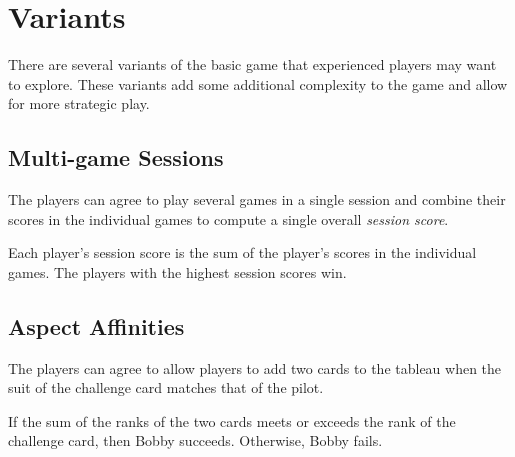 \documentclass[a4paper, 10pt,notumble]{leaflet}
\begin{document}
\section{Variants}
There are several variants of the basic game that experienced players may want to explore. These variants add some additional complexity to the game and allow for more strategic play.

\subsection{Multi-game Sessions}
The players can agree to play several games in a single session and combine their scores in the individual games to compute a single overall \emph{session score}.

Each player's session score is the sum of the player's scores in the individual games. The players with the highest session scores win.
	
\subsection{Aspect Affinities} 
The players can agree to allow players to add two cards to the tableau when the suit of the challenge card matches that of the pilot.

If the sum of the ranks of the two cards meets or exceeds the rank of the challenge card, then Bobby succeeds. Otherwise, Bobby fails.
\end{document}
